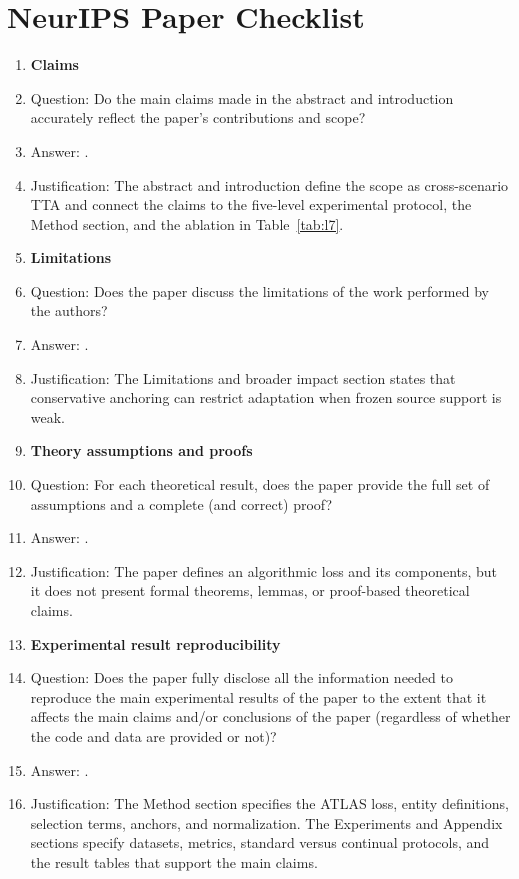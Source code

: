 \section*{NeurIPS Paper Checklist}

\begin{enumerate}

\item {\bf Claims}
    \item[] Question: Do the main claims made in the abstract and introduction accurately reflect the paper's contributions and scope?
    \item[] Answer: \answerYes{}.
    \item[] Justification: The abstract and introduction define the scope as cross-scenario TTA and connect the claims to the five-level experimental protocol, the Method section, and the ablation in Table~\ref{tab:l7}.

\item {\bf Limitations}
    \item[] Question: Does the paper discuss the limitations of the work performed by the authors?
    \item[] Answer: \answerYes{}.
    \item[] Justification: The Limitations and broader impact section states that conservative anchoring can restrict adaptation when frozen source support is weak.

\item {\bf Theory assumptions and proofs}
    \item[] Question: For each theoretical result, does the paper provide the full set of assumptions and a complete (and correct) proof?
    \item[] Answer: \answerNA{}.
    \item[] Justification: The paper defines an algorithmic loss and its components, but it does not present formal theorems, lemmas, or proof-based theoretical claims.

\item {\bf Experimental result reproducibility}
    \item[] Question: Does the paper fully disclose all the information needed to reproduce the main experimental results of the paper to the extent that it affects the main claims and/or conclusions of the paper (regardless of whether the code and data are provided or not)?
    \item[] Answer: \answerYes{}.
    \item[] Justification: The Method section specifies the ATLAS loss, entity definitions, selection terms, anchors, and normalization. The Experiments and Appendix sections specify datasets, metrics, standard versus continual protocols, and the result tables that support the main claims.


\end{enumerate}
